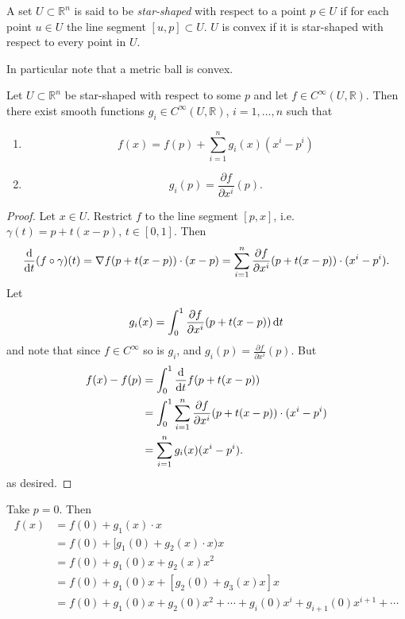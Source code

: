 \begin{defn}
A set $U \subset \mathbb{R}^n$ is said to be \emph{star-shaped} with
respect to a point $p \in U$ if for each point $u \in U$ the line
segment $[u, p] \subset U$. $U$ is convex if it is star-shaped with
respect to every point in $U$.
\end{defn}

In particular note that a metric ball is convex.

\begin{theorem}
Let $U \subset \mathbb{R}^n$ be star-shaped with respect to some $p$
and let $f \in C^\infty(U, \mathbb{R})$. Then there exist smooth
functions $g_i \in C^\infty(U, \mathbb{R})$, $i = 1, \dots, n$ such
that
\begin{enumerate}
  \item{
    $$
    f(x) = f(p) + \sum_{i=1}^n g_i(x) (x^i - p^i)
    $$
  }
  \item{
    $$
    g_i(p) = \frac{\partial f}{\partial x^i} (p).
    $$
  }
\end{enumerate}
\end{theorem}

\begin{proof}
Let $x \in U$. Restrict $f$ to the line segment $[p, x]$,
i.e. $\gamma(t) = p + t(x - p)$, $t \in [0, 1]$. Then
$$
  \frac{\mathop{}\!\mathrm{d}}{\mathop{}\!\mathrm{d} t} (f \circ \gamma) (t)
= \nabla f (p + t(x - p)) \cdot (x - p)
= \sum_{i=1}^n
    \frac{\partial f}
         {\partial x^i}
    (p + t(x - p))
    \cdot
    (x^i - p^i).
$$
Let
$$
  g_i(x)
= \int_0^1
    \frac{\partial f}
         {\partial x^i}
    (p + t(x - p))
    \mathop{}\!\mathrm{d} t
$$
and note that since $f \in C^\infty$ so is $g_i$, and
$g_i(p) = \frac{\partial f}{\partial x^i}(p)$. But
\begin{align*}
   f(x) - f(p)
&= \int_0^1
    \frac{\mathop{}\!\mathrm{d}}{\mathop{}\!\mathrm{d} t}
      f(p + t(x - p)) \\
&= \int_0^1
     \sum_{i=1}^n
       \frac{\partial f}
            {\partial x^i}
       (p + t(x - p))
       \cdot
       (x^i - p^i) \\
&= \sum_{i=1}^n
     g_i(x) (x^i - p^i).
\end{align*}
as desired.
\end{proof}

Take $p = 0$. Then
\begin{align*}
   f(x)
&= f(0) + g_1(x) \cdot x \\
&= f(0) + [g_1(0) + g_2(x) \cdot x) x \\
&= f(0) + g_1(0) x + g_2(x) x^2 \\
&= f(0) + g_1(0) x + [g_2(0) + g_3(x) x] x \\
&= f(0)
 + g_1(0) x
 + g_2(0) x^2
 + \cdots
 + g_i(0) x^i
 + g_{i+1}(0) x^{i+1}
 + \cdots
\end{align*}

